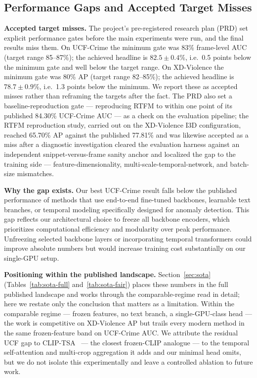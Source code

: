 \subsection{Performance Gaps and Accepted Target Misses}
\label{sec:lim-gaps}

\textbf{Accepted target misses.} The project's pre-registered research plan
(PRD) set explicit performance gates before the main experiments were run, and
the final results miss them. On UCF-Crime the minimum gate was 83\% frame-level
AUC (target range 85--87\%); the achieved headline is $82.5 \pm 0.4$\%, i.e.\
0.5 points below the minimum gate and well below the target range. On
XD-Violence the minimum gate was 80\% AP (target range 82--85\%); the achieved
headline is $78.7 \pm 0.9$\%, i.e.\ 1.3 points below the minimum. We report
these as accepted misses rather than reframing the targets after the fact. The
PRD also set a baseline-reproduction gate --- reproducing RTFM to within one
point of its published 84.30\% UCF-Crime AUC --- as a check on the evaluation
pipeline; the RTFM reproduction study, carried out on the XD-Violence I3D
configuration, reached 65.70\% AP against the published 77.81\% and was
likewise accepted as a miss after a diagnostic investigation cleared the
evaluation harness against an independent snippet-versus-frame sanity anchor
and localized the gap to the training side --- feature-dimensionality,
multi-scale-temporal-network, and batch-size mismatches.

\textbf{Why the gap exists.} Our best UCF-Crime result falls below the
published performance of methods that use end-to-end fine-tuned backbones,
learnable text branches, or temporal modeling specifically designed for
anomaly detection. This gap reflects our architectural choice to freeze all
backbone encoders, which prioritizes computational efficiency and modularity
over peak performance. Unfreezing selected backbone layers or incorporating
temporal transformers could improve absolute numbers but would increase
training cost substantially on our single-GPU setup.

\textbf{Positioning within the published landscape.} Section~\ref{sec:sota}
(Tables~\ref{tab:sota-full} and~\ref{tab:sota-fair}) places these numbers in
the full published landscape and works through the comparable-regime read in
detail; here we restate only the conclusion that matters as a limitation.
Within the comparable regime --- frozen features, no text branch, a
single-GPU-class head --- the work is competitive on XD-Violence AP but
trails every modern method in the same frozen-feature band on UCF-Crime AUC.
We attribute the residual UCF gap to CLIP-TSA~\cite{joo2023cliptsa} --- the
closest frozen-CLIP analogue --- to the temporal self-attention and
multi-crop aggregation it adds and our minimal head omits, but we do not
isolate this experimentally and leave a controlled ablation to future work.

